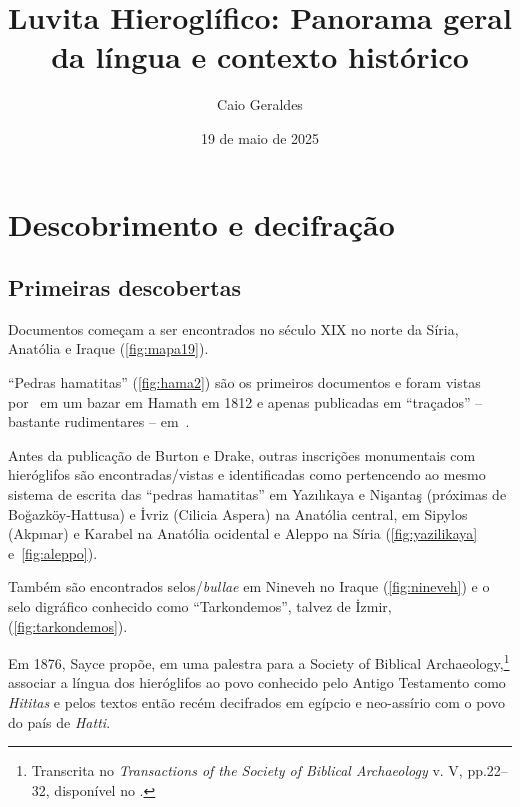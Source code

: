 \documentclass[article]{luvita}
\title{Luvita Hieroglífico: Panorama geral da língua e contexto histórico}
\author{Caio Geraldes}
\date{19 de maio de 2025}
\begin{document}
\frontmatter

\mainmatter%

\maketitle

\chapter{Descobrimento e decifração}

\section{Primeiras descobertas}

\begin{compactitem}
	\item Documentos começam a ser encontrados no século XIX no norte da Síria,
	Anatólia e Iraque (\autoref{fig:mapa19}).
	\begin{compactitem}
		\item ``Pedras hamatitas'' (\autoref{fig:hama2}) são os primeiros documentos e
		foram vistas por~\citet[146--7]{Burckhardt1822} em um bazar em Hamath em
		1812 e apenas publicadas em ``traçados'' -- bastante rudimentares --
		em~\citet[333--60]{UnexploredSyriaI}.
		\item Antes da publicação de Burton e Drake, outras inscrições monumentais
		com hieróglifos são encontradas\slash{}vistas e identificadas como
		pertencendo ao mesmo sistema de escrita das ``pedras hamatitas'' em
		Yazılıkaya e Nişantaş (próximas de Boğazköy-Hattusa) e İvriz (Cilicia
		Aspera) na Anatólia central, em Sipylos (Akpınar) e Karabel na Anatólia
		ocidental e Aleppo na Síria (\autoref{fig:yazilikaya} e~\autoref{fig:aleppo}).
		\item Também são encontrados selos\slash{}\emph{bullae} em Nineveh no
		Iraque (\autoref{fig:nineveh}) e o selo digráfico conhecido como
		``Tarkondemos'', talvez de İzmir, (\autoref{fig:tarkondemos}).
	\end{compactitem}
	\item Em 1876, Sayce propõe, em uma palestra para a Society of Biblical
	Archaeology,\footnote{Transcrita no \emph{Transactions of the Society of
			Biblical Archaeology} v. V, pp.22--32, disponível no
		.} associar a língua dos hieróglifos ao povo conhecido pelo Antigo
	Testamento como \emph{Hititas} e pelos textos então recém decifrados em
	egípcio e neo-assírio com o povo do país de \emph{Hatti}.
\end{compactitem}
\end{document}
